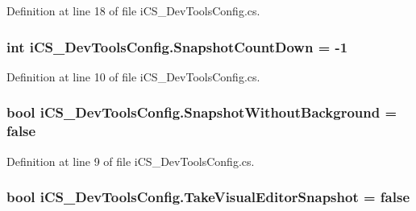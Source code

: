 Definition at line 18 of file i\+C\+S\+\_\+\+Dev\+Tools\+Config.\+cs.

\hypertarget{classi_c_s___dev_tools_config_a41c2d1234e77117f93eec81ff275e3a2}{
\subsubsection[{Snapshot\+Count\+Down}]{\setlength{\rightskip}{0pt plus 5cm}int i\+C\+S\+\_\+\+Dev\+Tools\+Config.\+Snapshot\+Count\+Down = -\/1\hspace{0.3cm}{\ttfamily [static]}}}\label{classi_c_s___dev_tools_config_a41c2d1234e77117f93eec81ff275e3a2}


Definition at line 10 of file i\+C\+S\+\_\+\+Dev\+Tools\+Config.\+cs.

\hypertarget{classi_c_s___dev_tools_config_a933a2e9464d675b9f9d7cee3cb2b9b92}{
\subsubsection[{Snapshot\+Without\+Background}]{\setlength{\rightskip}{0pt plus 5cm}bool i\+C\+S\+\_\+\+Dev\+Tools\+Config.\+Snapshot\+Without\+Background = false\hspace{0.3cm}{\ttfamily [static]}}}\label{classi_c_s___dev_tools_config_a933a2e9464d675b9f9d7cee3cb2b9b92}


Definition at line 9 of file i\+C\+S\+\_\+\+Dev\+Tools\+Config.\+cs.

\hypertarget{classi_c_s___dev_tools_config_a6c117bb70d526d278bd300b65e34b955}{
\subsubsection[{Take\+Visual\+Editor\+Snapshot}]{\setlength{\rightskip}{0pt plus 5cm}bool i\+C\+S\+\_\+\+Dev\+Tools\+Config.\+Take\+Visual\+Editor\+Snapshot = false\hspace{0.3cm}{\ttfamily [static]}}}\label{classi_c_s___dev_tools_config_a6c117bb70d526d278bd300b65e34b955}


